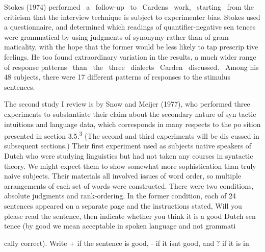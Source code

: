 \begin{styleStandard}
Stokes (1974) performed \ a \ follow-up \ to \ Carden{\textquotesingle}s \ work, \ starting \ from the criticism that the interview technique is subject to experimenter bias. Stokes used a questionnaire, and determined which readings of quantifier-negative sen\- tences were grammatical by using judgments of synonymy rather than of gram\- maticality, with the hope that the former would be less likely to tap prescrip\- tive feelings. He too found {\textquotedbl}extraordinary variation{\textquotedbl} in the results, a much wider range of response patterns \ than \ the \ three \ dialects \ Carden \ discussed. \ Among his 48 subjects, there were 17 different patterns of responses to the stimulus sentences.
\end{styleStandard}


\begin{styleStandard}
The second study I review is by Snow and Meijer (1977), who performed three experiments to substantiate their claim about the secondary nature of syn\- tactic intuitions and language data, which corresponds in many respects to the po\- sition presented in section 3.5.\textsuperscript{3}\textsuperscript{ }(The second and third experiments will be dis\- cussed in subsequent sections.) Their first experiment used as subjects native speakers of Dutch who were studying linguistics but had not taken any courses in syntactic theory. We might expect them to show somewhat more sophistication than truly naive subjects. Their materials all involved issues of word order, so multiple arrangements of each set of words were constructed. There were two conditions, absolute judgments and rank-ordering. In the former condition, each of 24 sentences appeared on a separate page and the instructions stated, {\textquotedbl}Will you please read the sentence, then indicate whether you think it is a good Dutch sen\- tence (by {\textquotesingle}good{\textquotesingle} we mean {\textquotesingle}acceptable in spoken language{\textquotesingle} and not {\textquotesingle}grammati\-
\end{styleStandard}


\begin{styleStandard}
cally correct{\textquotesingle}). Write + if the sentence is good, {}- if it isn{\textquotesingle}t good, and ? if it is in\-
\end{styleStandard}


